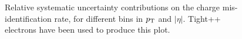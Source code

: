  \begin{figure}[htp!] 
\centering
\setlength{\fboxrule}{0 pt}
% 

% 
\caption{Relative systematic uncertainty contributions on the
      charge mis-identification rate, for different bins in $p_{\rm T}$ and 
      $|\eta|$. Tight++  electrons have been used to produce this plot.}\label{figure:background_qmissyst}
 \end{figure}




